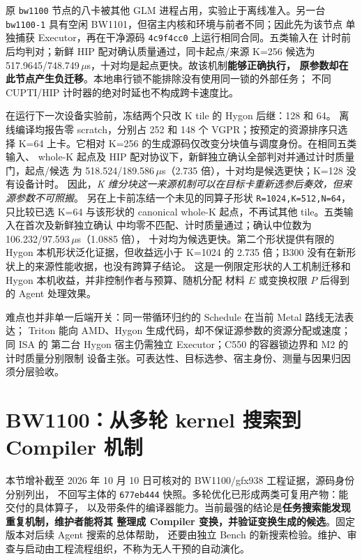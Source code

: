 \documentclass[UTF8,11pt,a4paper,fontset=none]{ctexart}
\newcommand{\code}[1]{\texttt{#1}}
\begin{document}
原 \code{bw1100} 节点的八卡被其他 GLM 进程占用，实验止于离线准入。另一台
\code{bw1100-1} 具有空闲 BW1101，但宿主内核和环境与前者不同；因此先为该节点
单独捕获 Executor，再在干净源码 \code{4c9f4cc0} 上运行相同合同。五类输入在
计时前后均判对；新鲜 HIP 配对确认质量通过，同卡起点/来源 K=256 候选为
517.9645/748.749\,$\mu$s，十对均是起点更快。故该机制\textbf{能够正确执行，
原参数却在此节点产生负迁移}。本地串行锁不能排除没有使用同一锁的外部任务；
不同 CUPTI/HIP 计时器的绝对时延也不构成跨卡速度比。

在运行下一次设备实验前，冻结两个只改 K tile 的 Hygon 后继：128 和 64。
离线编译均报告零 scratch，分别占 252 和 148 个 VGPR；按预定的资源排序只选择
K=64 上卡。它相对 K=256 的生成源码仅改变分块值与调度身份。在相同五类输入、
whole-K 起点及 HIP 配对协议下，新鲜独立确认全部判对并通过计时质量门，起点/候选
为 518.524/189.586\,$\mu$s（2.735 倍），十对均是候选更快；K=128 没有设备计时。
因此，\emph{K 维分块这一来源机制可以在目标卡重新选参后奏效，但来源参数不可照搬}。
另在上卡前冻结一个未见的同算子形状 \code{R=1024,K=512,N=64}，只比较已选 K=64
与该形状的 canonical whole-K 起点，不再试其他 tile。五类输入在首次及新鲜独立确认
中均零不匹配、计时质量通过；确认中位数为 106.232/97.593\,$\mu$s（1.0885 倍），
十对均为候选更快。第二个形状提供有限的 Hygon 本机形状泛化证据，但收益远小于
K=1024 的 2.735 倍；B300 没有在新形状上的来源性能收据，也没有跨算子结论。
这是一例限定形状的人工机制迁移和 Hygon 本机收益，并非控制作者与预算、随机分配
材料 $E$ 或变换权限 $P$ 后得到的 Agent 处理效果。

难点也并非单一后端开关：同一带循环归约的 Schedule 在当前 Metal 路线无法表达；
Triton 能向 AMD、Hygon 生成代码，却不保证源参数的资源分配或速度；同 ISA 的
第二台 Hygon 宿主仍需独立 Executor；C550 的容器锁边界和 M2 的计时质量分别限制
设备主张。可表达性、目标选参、宿主身份、测量与因果归因须分层验收。


\clearpage
\section{BW1100：从多轮 kernel 搜索到 Compiler 机制}\label{sec:bw-coevolution}

本节增补截至 2026 年 10 月 10 日可核对的 BW1100/gfx938 工程证据，源码身份分别列出，
不回写主体的 \code{677eb444} 快照。多轮优化已形成两类可复用产物：能交付的具体算子，
以及带条件的编译器能力。当前最强的结论是\textbf{任务搜索能发现重复机制，维护者能将其
整理成 Compiler 变换，并验证变换生成的候选}。固定版本对后续 Agent 搜索的总体帮助，
还要由独立 Bench 的新搜索检验。维护、审查与启动由工程流程组织，不称为无人干预的自动演化。
\end{document}
